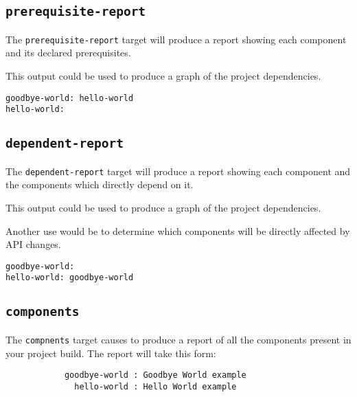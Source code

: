 \subsection{\texttt{prerequisite-report}}

The \texttt{prerequisite-report} target will produce a report showing
each component and its declared prerequisites.

This output could be used to produce a graph of the project dependencies.

\begin{verbatim}
goodbye-world: hello-world
hello-world:
\end{verbatim}

\subsection{\texttt{dependent-report}}

The \texttt{dependent-report} target will produce a report showing
each component and the components which directly depend on it.

This output could be used to produce a graph of the project
dependencies.

Another use would be to determine which components will be directly
affected by API changes.

\begin{verbatim}
goodbye-world:
hello-world: goodbye-world
\end{verbatim}

\subsection{\texttt{components}}\label{lmsbw:target:components}

The \texttt{compnents} target causes \lmsbw to produce a report of all
the components present in your project build.  The report will take
this form:

\begin{verbatim}
            goodbye-world : Goodbye World example
              hello-world : Hello World example
\end{verbatim}
